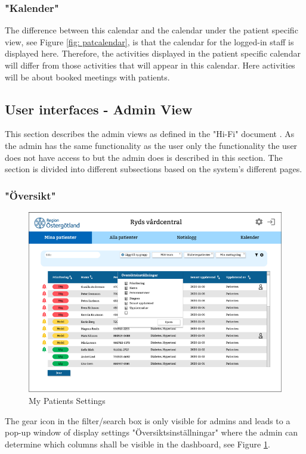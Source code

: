 \documentclass{scrreprt}
\begin{document}
\subsubsection{"Kalender"}
The difference between this calendar and the calendar under the patient specific view, see Figure \ref{fig: patcalendar}, is that the calendar for the logged-in staff is displayed here. Therefore, the activities displayed in the patient specific calendar will differ from those activities that will appear in this calendar. Here activities will be about booked meetings with patients. 

\subsection{User interfaces -  Admin View}
\label{section: admin}
This section describes the admin views as defined in the "Hi-Fi" document \cite{prototype}. As the admin has the same functionality as the user only the functionality the user does not have access to but the admin does is described in this section. The section is divided into different subsections based on the system's different pages.

\subsubsection{"Översikt"}
\begin{figure}[h!]
    \centering
    \includegraphics[width=15cm]{mypatsettings.png}
    \caption{My Patients Settings}
    \label{fig: mypatsettings}
\end{figure}

The gear icon in the filter/search box is only visible for admins and leads to a pop-up window of display settings "Översiktsinställningar" where the admin can determine which columns shall be visible in the dashboard, see Figure \ref{fig: mypatsettings}.
\end{document}
